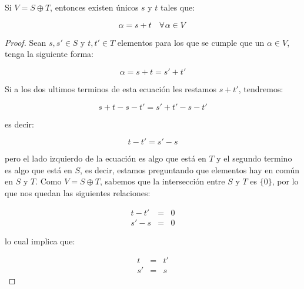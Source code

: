 		\begin{proposicion}
			Si $V = S \oplus T$, entonces existen únicos $s$ y $t$ tales que:

			\begin{equation}
				\alpha = s + t \quad \forall \mkern2mu \alpha \in V
			\end{equation}
		\end{proposicion}

		\begin{proof}
			Sean $s, s' \in S$ y $t, t' \in T$ elementos para los que se cumple que un $\alpha \in V$, tenga la siguiente forma:

			\begin{equation*}
				\alpha = s + t = s' + t'
			\end{equation*}

			Si a los dos ultimos terminos de esta ecuación les restamos $s + t'$, tendremos:

			\begin{equation*}
				s + t - s - t' = s' + t' - s - t'
			\end{equation*}

			es decir:

			\begin{equation*}
				t - t' = s' - s
			\end{equation*}

			pero el lado izquierdo de la ecuación es algo que está en $T$ y el segundo termino es algo que está en $S$, es decir, estamos preguntando que elementos hay en común en $S$ y $T$.
			Como $V = S \oplus T$, sabemos que la intersección entre $S$ y $T$ es $\{0\}$, por lo que nos quedan las siguientes relaciones:

			\begin{eqnarray*}
				t - t' & = & 0 \\
				s' - s & = & 0
			\end{eqnarray*}

			lo cual implica que:

			\begin{eqnarray*}
				t & = & t' \\
				s' & = & s
			\end{eqnarray*}
		\end{proof}

